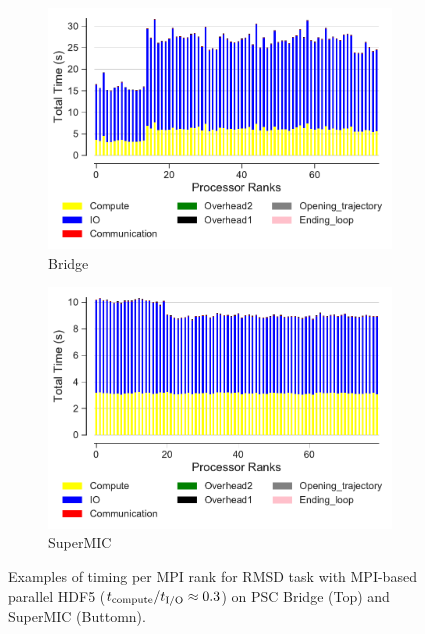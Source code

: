 \begin{figure}[ht!]
\centering
\begin{subfigure}{.6\textwidth}
  \includegraphics[width=\linewidth]{figures/Bridge-MPI-IO-BarPlot-rank-comparison_78_5.pdf}
  \caption{Bridge}
  \label{fig:hdf5-bridge}
\end{subfigure}
\bigskip
\begin{subfigure} {.6\textwidth}
  \includegraphics[width=\linewidth]{figures/SuperMIC-MPI-IO-BarPlot-rank-comparison_80_5.pdf}
  \caption{SuperMIC}
  \label{fig:hdf5-SuperMIC}
\end{subfigure}
%
\caption{Examples of timing per MPI rank for RMSD task with MPI-based parallel HDF5 (${t}_{\text{compute}}/{t}_{\text{I/O}} \approx 0.3$) on PSC Bridge (Top) and SuperMIC (Buttomn).}
\label{fig:MPIwithIO}
\end{figure} 

